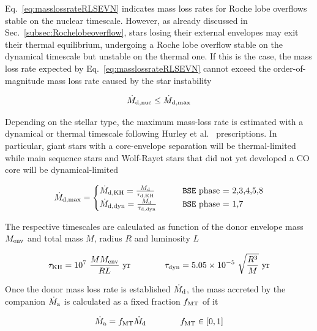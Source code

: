 \documentclass[a4paper,titlepage]{book}     	%
\newcommand{\mdot}{\ensuremath{\dot{M}}}
\newcommand{\yr}{\text{yr}}
\begin{document}
Eq.\ \ref{eq:masslossrateRLSEVN} indicates mass loss rates for Roche lobe overflows stable on the nuclear timescale. However, as already discussed in Sec.\ \ref{subsec:Rochelobeoverflow}, stars losing their external envelopes may exit their thermal equilibrium, undergoing a Roche lobe overflow stable on the dynamical timescale but unstable on the thermal one. If this is the case, the mass loss rate expected by Eq.\ \ref{eq:masslossrateRLSEVN} cannot exceed the order-of-magnitude mass loss rate caused by the star instability

\begin{equation}
    \mdot_{\rm d, nuc} \leq \mdot_{\rm d, max}
\end{equation}

Depending on the stellar type, the maximum mass-loss rate is estimated with a dynamical or thermal timescale following Hurley et al.\ \cite{Hurley2002} prescriptions. In particular, giant stars with a core-envelope separation will be thermal-limited while main sequence stars and Wolf-Rayet stars that did not yet developed a CO core will be dynamical-limited

\begin{equation}
    \mdot_{\rm d, max} = 
    \begin{cases}
        \mdot_{\rm d, KH} = \frac{M_{\rm d}}{\tau_{\rm d, KH}}   & \qquad \texttt{BSE} ~\text{phase = 2,3,4,5,8} \\
        \mdot_{\rm d, dyn} = \frac{M_{\rm d}}{\tau_{\rm d, dyn}} & \qquad \texttt{BSE}~\text{phase = 1,7}
    \end{cases}
\end{equation}

The respective timescales are calculated as function of the donor envelope mass $M_{\rm env}$ and total mass $M$, radius $R$ and luminosity $L$

\begin{equation}
    \tau_{\rm KH} = 10^7 ~\frac{M M_{\rm env}}{RL}~\yr \qquad \qquad \tau_{\rm dyn} = 5.05 \times 10^{-5}~ \sqrt{\frac{R^3}{M}}~\yr
\end{equation}

Once the donor mass loss rate is established $\mdot_{\rm d}$, the mass accreted by the companion $\mdot_{\rm a}$ is calculated as a fixed fraction $f_{\rm MT}$ of it

\begin{equation}\label{eq:accretionrateSEVN}
    \mdot_{\rm a} = f_{\rm MT} \mdot_{\rm d} \qquad \qquad f_{\rm MT} \in [0,1]
\end{equation}
\end{document}
